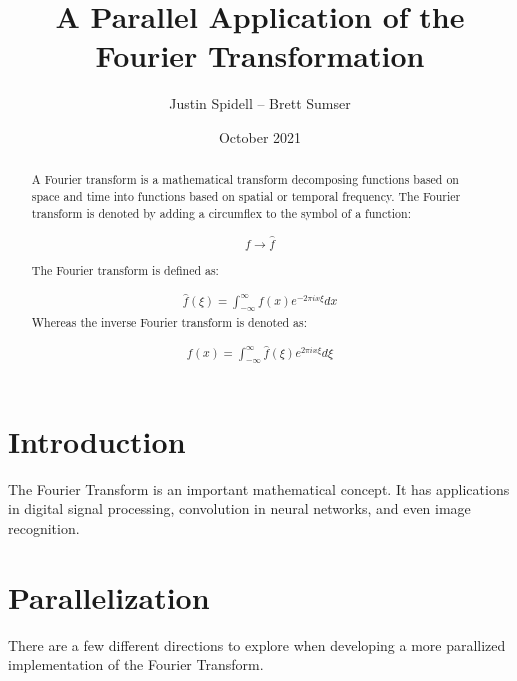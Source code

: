 \documentclass[12pt]{extarticle}
\title{A Parallel Application of the Fourier Transformation}
\author{Justin Spidell -- Brett Sumser}
\date{October 2021}
\begin{document}
 
\maketitle
\newpage
\begin{abstract}

A Fourier transform is a mathematical transform decomposing functions based on space and time into functions based on spatial or temporal frequency. The Fourier transform is denoted by adding a circumflex to the symbol of a function:

\begin{align*}
f \rightarrow \hat{f}
\end{align*}

The Fourier transform is defined as:

\begin{align}
\hat{f} (\xi)= \int^{\infty}_{-\infty}f(x) e^{-2 \pi i x \xi}dx
\end{align}
Whereas the inverse Fourier transform is denoted as:

\begin{align}
{f} (x)= \int^{\infty}_{-\infty}\hat{f}(\xi) e^{2 \pi i x \xi}d\xi
\end{align}

\end{abstract}


\maketitle
\newpage
\section*{Introduction}

    The Fourier Transform is an important mathematical concept. It has applications
    in digital signal processing, convolution in neural networks, and even image recognition.

\maketitle
\newpage
\section*{Parallelization} 
    
    There are a few different directions to explore when developing a more
    parallized implementation of the Fourier Transform. 




\end{document}
